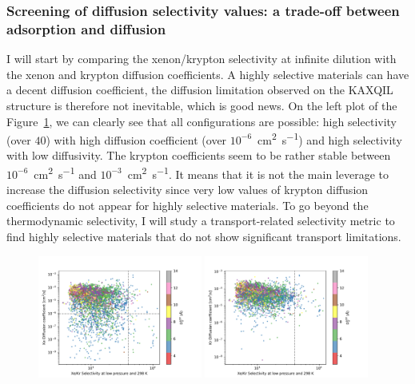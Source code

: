 \documentclass[main]{subfiles}
\begin{document}
\subsubsection{Screening of diffusion selectivity values: a trade-off between adsorption and diffusion}\label{sct:diff_screen}

I will start by comparing the xenon/krypton selectivity at infinite dilution with the xenon and krypton diffusion coefficients. A highly selective materials can have a decent diffusion coefficient, the diffusion limitation observed on the KAXQIL structure is therefore not inevitable, which is good news. On the left plot of the Figure~\ref{fgr:diff_s0_lcd}, we can clearly see that all configurations are possible: high selectivity (over $40$) with high diffusion coefficient (over $10^{-6}$~\si{\square\cm\per\s}) and high selectivity with low diffusivity. The krypton coefficients seem to be rather stable between $10^{-6}$~\si{\square\cm\per\s} and $10^{-3}$~\si{\square\cm\per\s}. It means that it is not the main leverage to increase the diffusion selectivity since very low values of krypton diffusion coefficients do not appear for highly selective materials. To go beyond the thermodynamic selectivity, I will study a transport-related selectivity metric to find highly selective materials that do not show significant transport limitations.

\begin{figure}[ht]
  \centering
    \includegraphics[width=0.48\textwidth]{figures/5-diffusion/D_xe-s0-lcd.pdf}
    \includegraphics[width=0.48\textwidth]{figures/5-diffusion/D_kr-s0-lcd.pdf}
    \caption{}\label{fgr:diff_s0_lcd}
\end{figure}
\end{document}
